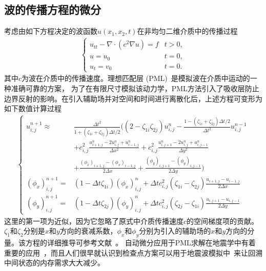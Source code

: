 \documentclass[A4,twoside,UTF8]{ctexart}
\begin{document}
\baselineskip
\subsection{波的传播方程的微分}
考虑由如下方程决定的波函数$u(x_1, x_2, t)$在非均匀二维介质中的传播过程
\begin{align}
    \begin{cases}
    u_{tt} - \nabla\cdot(c^2\nabla u) = f & t>0,\\
    u = u_0 & t=0,\\
    u_t = v_0 & t=0.
    \end{cases}
\end{align}
其中$c$为波在介质中的传播速度。理想匹配层 (PML)~\cite{Berenger1994,Roden2000,MaKoEz08}是模拟波在介质中运动的一种准确可靠的方案，
为了在有限尺寸模拟该动力学，PML方法引入了吸收层防止边界反射的影响。在引入辅助场并对空间和时间进行离散化后，上述方程可变形为如下数值计算过程
\begin{align}
    \begin{cases}
        u^{n+1}_{i,j} \approx &\frac{\Delta t^2}{1+(\zeta_{1i}+\zeta_{2j})\Delta t/2}\bigg(
        \left(2-\zeta_{1i}\zeta_{2j}\right)u_{i,j}^n - \frac{1-(\zeta_{1i}+\zeta_{2j})\Delta t/2}{\Delta t^2}u^{n-1}_{i,j}\\
        &+ c_{i,j}^2\frac{u_{i+1,j}^n-2u_{i,j}^n+u_{i-1,j}^n}{\Delta x^2} + c_{i,j}^2\frac{u_{i,j+1}^n-2u_{i,j}^n+u_{i,j-1}^n}{\Delta y^2}\\
        &+ \frac{(\phi_x)_{i+1,j}-(\phi_x)_{i-1,j}}{2\Delta x} + \frac{(\phi_y)_{i,j+1}-(\phi_y)_{i,j-1}}{2\Delta y}\bigg)\\
        (\phi_x)_{i,j}^{n+1} =& (1-\Delta t \zeta_{1i})(\phi_x)_{i,j}^n + \Delta t c_{i,j}^2 (\zeta_{1i}-\zeta_{2j})\frac{u_{i+1,j}-u_{i-1,j}}{2\Delta x}\\
        (\phi_y)_{i,j}^{n+1} =& (1-\Delta t \zeta_{2j})(\phi_y)_{i,j}^n + \Delta t c_{i,j}^2 (\zeta_{2j}-\zeta_{1i})\frac{u_{i,j+1}-u_{i,j-1}}{2\Delta y}
    \end{cases}
\end{align}
这里的第一项为近似，因为它忽略了原式中介质传播速度$c$的空间梯度项的贡献。$\zeta_1$和$\zeta_2$分别是$x$和$y$方向的衰减系数，$\phi_x$和$\phi_y$分别为引入的辅助场的$x$和$y$方向的分量。该方程的详细推导可参考文献~\cite{Grote2010}。
自动微分应用于PML求解在地震学中有着重要的应用~\cite{Zhu2020}，而且人们很早就认识到检查点方案可以用于地震波模拟中~\cite{Symes2007}来让回溯中间状态的内存需求大大减少。
\end{document}
